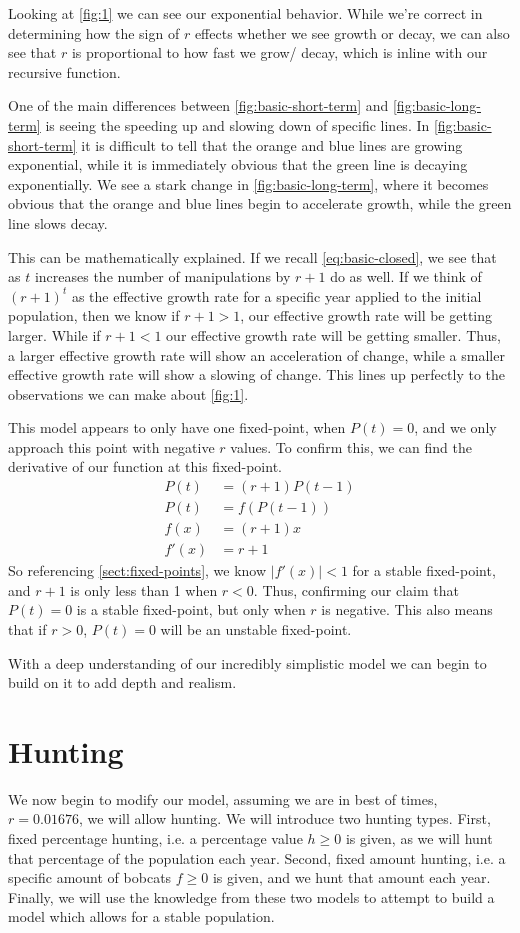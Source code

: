 \documentclass{article}
\begin{document}
Looking at \cref{fig:1} we can see our exponential behavior. While we're correct in determining how the sign of $r$ effects whether we see growth or decay, we can also see that $r$ is proportional to how fast we grow/ decay, which is inline with our recursive function.

One of the main differences between \cref{fig:basic-short-term} and \cref{fig:basic-long-term} is seeing the speeding up and slowing down of specific lines. In \cref{fig:basic-short-term} it is difficult to tell that the orange and blue lines are growing exponential, while it is immediately obvious that the green line is decaying exponentially. We see a stark change in \cref{fig:basic-long-term}, where it becomes obvious that the orange and blue lines begin to accelerate growth, while the green line slows decay.

This can be mathematically explained. If we recall \cref{eq:basic-closed}, we see that as $t$ increases the number of manipulations by $r + 1$ do as well. If we think of $(r+1)^t$ as the effective growth rate for a specific year applied to the initial population, then we know if $r + 1 > 1$, our effective growth rate will be getting larger. While if $r + 1 < 1$ our effective growth rate will be getting smaller. Thus, a larger effective growth rate will show an acceleration of change, while a smaller effective growth rate will show a slowing of change. This lines up perfectly to the observations we can make about \cref{fig:1}.

This model appears to only have one fixed-point, when $P(t) = 0$, and we only approach this point with negative $r$ values. To confirm this, we can find the derivative of our function at this fixed-point.
\begin{align*}
    P(t) &= (r+1)P(t-1) \\
    P(t) &= f(P(t-1)) \\
    f(x) &= (r+1)x \\
    f'(x) &= r+1
\end{align*}
So referencing \cref{sect:fixed-points}, we know $|f'(x)| < 1$ for a stable fixed-point, and $r+1$ is only less than 1 when $r < 0$. Thus, confirming our claim that $P(t) = 0$ is a stable fixed-point, but only when $r$ is negative. This also means that if $r > 0$, $P(t) = 0$ will be an unstable fixed-point.

With a deep understanding of our incredibly simplistic model we can begin to build on it to add depth and realism.

\section{Hunting}
We now begin to modify our model, assuming we are in best of times, $r = 0.01676$, we will allow hunting. We will introduce two hunting types. First, fixed percentage hunting, i.e. a percentage value $h \ge 0$ is given, as we will hunt that percentage of the population each year. Second, fixed amount hunting, i.e. a specific amount of bobcats $f \ge 0$ is given, and we hunt that amount each year. Finally, we will use the knowledge from these two models to attempt to build a model which allows for a stable population.
\end{document}
